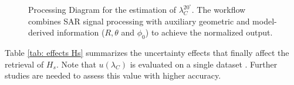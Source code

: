 \begin{figure}[htbp]
{
	}
	\caption{Processing Diagram for the estimation of $\lambda_{C}^{20^{\circ}}$. The workflow combines SAR signal processing with auxiliary geometric and model-derived information ($R, \theta$ and $\phi_0$) to achieve the normalized output.}
	\label{fig: proc_diag_lambda20}
\end{figure}

Table \ref{tab: effects Hs} summarizes the uncertainty effects that finally affect the retrieval of $H_{s}$. Note that $u(\lambda_{C})$ is evaluated on a single dataset \cite{GriecoIJRS2016}. Further studies are needed to assess this value with higher accuracy.

